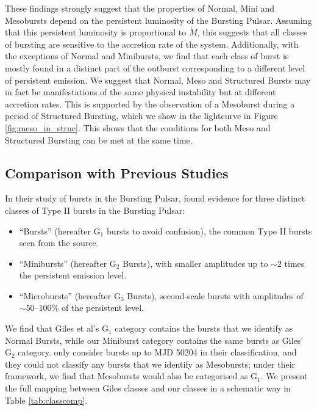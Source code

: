 \par These findings strongly suggest that the properties of Normal, Mini and Mesobursts depend on the persistent luminosity of the Bursting Pulsar.  Assuming that this persistent luminosity is proportional to $\dot{M}$, this suggests that all classes of bursting are sensitive to the accretion rate of the system.  Additionally, with the exceptions of Normal and Minibursts, we find that each class of burst is mostly found in a distinct part of the outburst corresponding to a different level of persistent emission.  We suggest that Normal, Meso and Structured Bursts may in fact be manifestations of the same physical instability but at different accretion rates.  This is supported by the observation of a Mesoburst during a period of Structured Bursting, which we show in the lightcurve in Figure \ref{fig:meso_in_struc}.  This shows that the conditions for both Meso and Structured Bursting can be met at the same time.

\subsection{Comparison with Previous Studies}

\par In their study of bursts in the Bursting Pulsar, \citet{Giles_BP} found evidence for three distinct classes of Type II bursts in the Bursting Pulsar:

\begin{itemize}
\item ``Bursts'' (hereafter G$_1$ bursts to avoid confusion), the common Type II bursts seen from the source.
\item ``Minibursts'' (hereafter G$_2$  Bursts), with smaller amplitudes up to $\sim2$ times the persistent emission level.
\item ``Microbursts'' (hereafter G$_3$  Bursts), second-scale bursts with amplitudes of $\sim50$--$100\%$ of the persistent level.
\end{itemize}

We find that Giles et al's G$_1$ category contains the bursts that we identify as Normal Bursts, while our Miniburst category contains the same bursts as Giles' G$_2$ category.  \citet{Giles_BP} only consider bursts up to MJD 50204 in their classification, and they could not classify any bursts that we identify as Mesobursts; under their framework, we find that Mesobursts would also be categorised as G$_1$.  We present the full mapping between Giles classes and our classes in a schematic way in Table \ref{tab:classcomp}.

